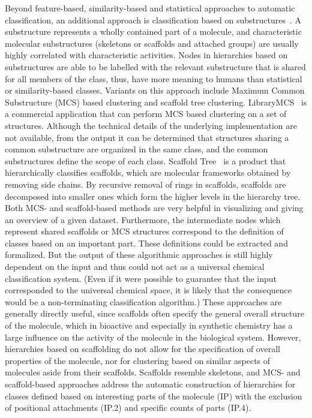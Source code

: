 \documentclass[10pt]{bmc_article}
\newenvironment{bmcformat}{\baselineskip20pt\sloppy\setboolean{publ}{false}}{\baselineskip20pt\sloppy}
\begin{document}
\begin{bmcformat}
Beyond feature-based, similarity-based and statistical approaches to automatic classification, an additional approach is classification based on substructures~\cite{deshpande2005}.  A substructure represents a wholly contained part of a molecule, and characteristic molecular substructures (skeletons or scaffolds and attached groups) are usually highly correlated with characteristic activities.  Nodes in hierarchies based on substructures are able to be labelled with the relevant substructure that is shared for all members of the class, thus, have more meaning to humans than statistical or similarity-based classes. Variants on this approach include Maximum Common Substructure (MCS) based clustering and scaffold tree clustering. LibraryMCS~\cite{librarymcs} is a commercial application that can perform MCS based clustering on a set of structures. Although the technical details of the underlying implementation are not available, from the output it can be determined that structures sharing a common substructure are organized in the same class, and the common substructures define the scope of each class.  Scaffold Tree~\cite{Schuffenhauer2007} is a product that hierarchically classifies scaffolds, which are molecular frameworks obtained by removing side chains.  By recursive removal of rings in scaffolds, scaffolds are decomposed into smaller ones which form the higher levels in the hierarchy tree.  Both MCS- and scaffold-based methods are very helpful in visualizing and giving an overview of a given dataset.  Furthermore, the intermediate nodes which represent shared scaffolds or MCS structures correspond to the definition of classes based on an important part.  These definitions could be extracted and formalized.  But the output of these algorithmic approaches is still highly dependent on the input and thus could not act as a universal chemical classification system. (Even if it were possible to guarantee that the input corresponded to the universal chemical space, it is likely that the consequence would be a non-terminating classification algorithm.)  These approaches are generally directly useful, since scaffolds often specify the general overall structure of the molecule, which in bioactive and especially in synthetic chemistry has a large influence on the activity of the molecule in the biological system.  However, hierarchies based on scaffolding do not allow for the specification of overall properties of the molecule, nor for clustering based on similar aspects of molecules aside from their scaffolds.  Scaffolds resemble skeletons, and MCS- and scaffold-based approaches address the automatic construction of hierarchies for classes defined based on interesting parts of the molecule (IP) with the exclusion of positional attachments (IP.2) and specific counts of parts (IP.4). 


\end{bmcformat}
\end{document}
